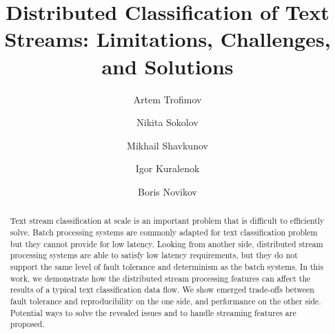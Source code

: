 \documentclass[sigconf]{acmart}
\theoremstyle{remark}
\begin{document}

\title {Distributed Classification of Text Streams: Limitations, Challenges, and Solutions}


\author{Artem Trofimov}

\author{Nikita Sokolov}

\author{Mikhail Shavkunov}

\author{Igor Kuralenok}

\author{Boris Novikov}

\begin{abstract}

Text stream classification at scale is an important problem that is difficult to efficiently solve. Batch processing systems are commonly adapted for text classification problem but they cannot provide for low latency. Looking from another side, distributed stream processing systems are able to satisfy low latency requirements, but they do not support the same level of fault tolerance and determinism as the batch systems. In this work, we demonstrate how the distributed stream processing features can affect the results of a typical text classification data flow. We show emerged trade-offs between fault tolerance and reproducibility on the one side, and performance on the other side. Potential ways to solve the revealed issues and to handle streaming features are proposed.

\end{abstract}
\end{document}
